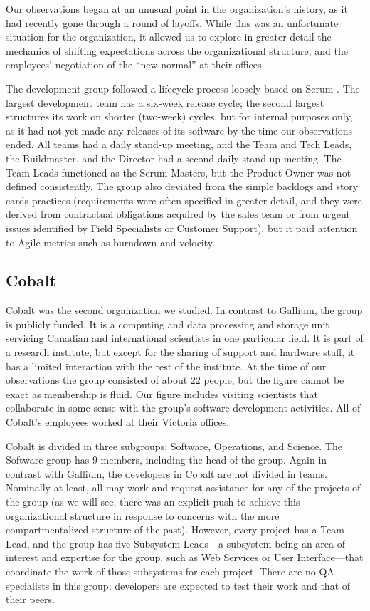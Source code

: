 \documentclass[10pt, conference, compsocconf]{IEEEtran}
\begin{document}
Our observations began at an unusual point in the organization's history, as it had recently gone through a round of layoffs. While this was an unfortunate situation for the organization, it allowed us to explore in greater detail the mechanics of shifting expectations across the organizational structure, and the employees' negotiation of the ``new normal'' at their offices.

The development group followed a lifecycle process loosely based on Scrum \cite{Schwaber2001}. The largest development team has a six-week release cycle; the second largest structures its work on shorter (two-week) cycles, but for internal purposes only, as it had not yet made any releases of its software by the time our observations ended. All teams had a daily stand-up meeting, and the Team and Tech Leads, the Buildmaster, and the Director had a second daily stand-up meeting. The Team Leads functioned as the Scrum Masters, but the Product Owner was not defined consistently. The group also deviated from the simple backlogs and story cards practices (requirements were often specified in greater detail, and they were derived from contractual obligations acquired by the sales team or from urgent issues identified by Field Specialists or Customer Support), but it paid attention to Agile metrics such as burndown and velocity.



\subsection{Cobalt}

Cobalt was the second organization we studied. In contrast to Gallium, the group is publicly funded. It is a computing and data processing and storage unit servicing Canadian and international scientists in one particular field. It is part of a research institute, but except for the sharing of support and hardware staff, it has a limited interaction with the rest of the institute. At the time of our observations the group consisted of about 22 people, but the figure cannot be exact as membership is fluid. Our figure includes visiting scientists that collaborate in some sense with the group's software development activities. All of Cobalt's employees worked at their Victoria offices.

Cobalt is divided in three subgroups: Software, Operations, and Science. The Software group has 9 members, including the head of the group. Again in contrast with Gallium, the developers in Cobalt are not divided in teams. Nominally at least, all may work and request assistance for any of the projects of the group (as we will see, there was an explicit push to achieve this organizational structure in response to concerns with the more compartmentalized structure of the past). However, every project has a Team Lead, and the group has five Subsystem Leads---a subsystem being an area of interest and expertise for the group, such as Web Services or User Interface---that coordinate the work of those subsystems for each project. There are no QA specialists in this group; developers are expected to test their work and that of their peers.
\end{document}
